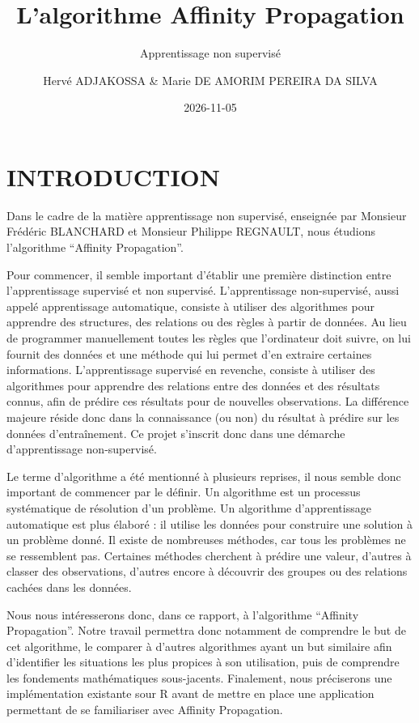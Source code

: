 \documentclass[
  letterpaper,
  DIV=11,
  numbers=noendperiod]{scrartcl}
\title{L'algorithme Affinity Propagation}
\subtitle{Apprentissage non supervisé}
\author{Hervé ADJAKOSSA \& Marie DE AMORIM PEREIRA DA SILVA}
\date{2026-11-05}
\renewcommand*\contentsname{Table of contents}
\newcommand\contentsname{Table of contents}
\begin{document}
\maketitle

\renewcommand*\contentsname{Table des matières}
{
\setcounter{tocdepth}{3}
\tableofcontents
}

\newpage

\section{INTRODUCTION}\label{introduction}

Dans le cadre de la matière apprentissage non supervisé, enseignée par
Monsieur Frédéric BLANCHARD et Monsieur Philippe REGNAULT, nous étudions
l'algorithme ``Affinity Propagation''.

Pour commencer, il semble important d'établir une première distinction
entre l'apprentissage supervisé et non supervisé. L'apprentissage
non-supervisé, aussi appelé apprentissage automatique, consiste à
utiliser des algorithmes pour apprendre des structures, des relations ou
des règles à partir de données. Au lieu de programmer manuellement
toutes les règles que l'ordinateur doit suivre, on lui fournit des
données et une méthode qui lui permet d'en extraire certaines
informations. L'apprentissage supervisé en revenche, consiste à utiliser
des algorithmes pour apprendre des relations entre des données et des
résultats connus, afin de prédire ces résultats pour de nouvelles
observations. La différence majeure réside donc dans la connaissance (ou
non) du résultat à prédire sur les données d'entraînement. Ce projet
s'inscrit donc dans une démarche d'apprentissage non-supervisé.

Le terme d'algorithme a été mentionné à plusieurs reprises, il nous
semble donc important de commencer par le définir. Un algorithme est un
processus systématique de résolution d'un problème. Un algorithme
d'apprentissage automatique est plus élaboré : il utilise les données
pour construire une solution à un problème donné. Il existe de
nombreuses méthodes, car tous les problèmes ne se ressemblent pas.
Certaines méthodes cherchent à prédire une valeur, d'autres à classer
des observations, d'autres encore à découvrir des groupes ou des
relations cachées dans les données.

Nous nous intéresserons donc, dans ce rapport, à l'algorithme ``Affinity
Propagation''. Notre travail permettra donc notamment de comprendre le
but de cet algorithme, le comparer à d'autres algorithmes ayant un but
similaire afin d'identifier les situations les plus propices à son
utilisation, puis de comprendre les fondements mathématiques
sous-jacents. Finalement, nous préciserons une implémentation existante
sour R avant de mettre en place une application permettant de se
familiariser avec Affinity Propagation.
\end{document}
